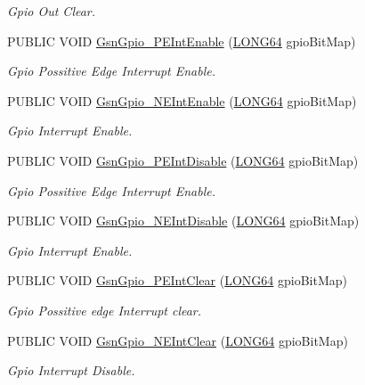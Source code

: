\begin{DoxyCompactItemize}
\begin{DoxyCompactList}\small\item\em Gpio Out Clear. \end{DoxyCompactList}\item 
PUBLIC VOID \hyperlink{a00648_gaba2b3db43960f2d257bcc9da83e51db4}{GsnGpio\_\-PEIntEnable} (\hyperlink{a00660_gae57305825c7d329ad8a3065ae045e875}{LONG64} gpioBitMap)
\begin{DoxyCompactList}\small\item\em Gpio Possitive Edge Interrupt Enable. \end{DoxyCompactList}\item 
PUBLIC VOID \hyperlink{a00648_ga9f8bfa1b71f64bd2dcf06ff51e085d26}{GsnGpio\_\-NEIntEnable} (\hyperlink{a00660_gae57305825c7d329ad8a3065ae045e875}{LONG64} gpioBitMap)
\begin{DoxyCompactList}\small\item\em Gpio Interrupt Enable. \end{DoxyCompactList}\item 
PUBLIC VOID \hyperlink{a00648_ga61b46966afa3dafd5fd49035a991aef9}{GsnGpio\_\-PEIntDisable} (\hyperlink{a00660_gae57305825c7d329ad8a3065ae045e875}{LONG64} gpioBitMap)
\begin{DoxyCompactList}\small\item\em Gpio Possitive Edge Interrupt Enable. \end{DoxyCompactList}\item 
PUBLIC VOID \hyperlink{a00648_ga170e15d6ae8011c0a008e6309715a23a}{GsnGpio\_\-NEIntDisable} (\hyperlink{a00660_gae57305825c7d329ad8a3065ae045e875}{LONG64} gpioBitMap)
\begin{DoxyCompactList}\small\item\em Gpio Interrupt Enable. \end{DoxyCompactList}\item 
PUBLIC VOID \hyperlink{a00648_ga4408d667f2fcbc51c669e8a8b25e2f6c}{GsnGpio\_\-PEIntClear} (\hyperlink{a00660_gae57305825c7d329ad8a3065ae045e875}{LONG64} gpioBitMap)
\begin{DoxyCompactList}\small\item\em Gpio Possitive edge Interrupt clear. \end{DoxyCompactList}\item 
PUBLIC VOID \hyperlink{a00648_ga4b1dc7062930fe980b86818e438c1cb0}{GsnGpio\_\-NEIntClear} (\hyperlink{a00660_gae57305825c7d329ad8a3065ae045e875}{LONG64} gpioBitMap)
\begin{DoxyCompactList}\small\item\em Gpio Interrupt Disable. \end{DoxyCompactList}\item 

\end{DoxyCompactItemize}
